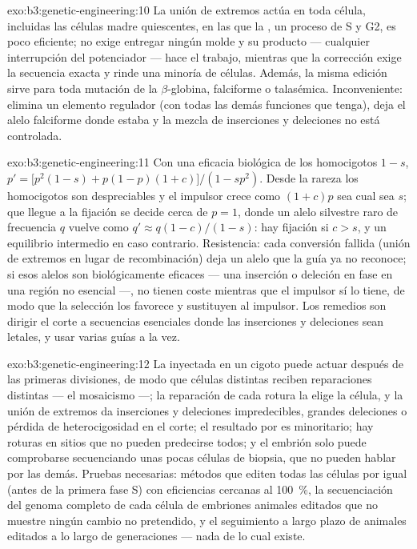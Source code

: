 \begin{solution}{exo:b3:genetic-engineering:10}
La unión de extremos actúa en toda célula, incluidas las células madre
quiescentes, en las que la , un proceso de S y G2,
es poco eficiente; no exige entregar ningún molde y su producto ---
cualquier interrupción del potenciador --- hace el trabajo, mientras que
la corrección exige la secuencia exacta y rinde una minoría de células.
Además, la misma edición sirve para toda mutación de la
$\beta$-globina, falciforme o talasémica. Inconveniente: elimina un
elemento regulador (con todas las demás funciones que tenga), deja el
alelo falciforme donde estaba y la mezcla de inserciones y deleciones no
está controlada.
\end{solution}

\begin{solution}{exo:b3:genetic-engineering:11}
Con una eficacia biológica de los homocigotos $1 - s$,
$p' = \bigl[p^{2}(1-s) + p(1-p)(1+c)
\bigr]/(1 - sp^{2})$. Desde la rareza los homocigotos son despreciables y
el impulsor crece como $(1+c)p$ sea cual sea $s$; que llegue a la
fijación se decide cerca de $p = 1$, donde un alelo silvestre raro de
frecuencia $q$ vuelve como $q' \approx q(1-c)/(1-s)$: hay fijación si
$c > s$, y un equilibrio intermedio en caso contrario. Resistencia: cada
conversión fallida (unión de extremos en lugar de recombinación) deja un
alelo que la guía ya no reconoce; si esos alelos son biológicamente
eficaces --- una inserción o deleción en fase en una región no esencial
---, no tienen coste mientras que el impulsor sí lo tiene, de modo que la
selección los favorece y sustituyen al impulsor. Los remedios son dirigir
el corte a secuencias esenciales donde las inserciones y deleciones sean
letales, y usar varias guías a la vez.
\end{solution}

\begin{solution}{exo:b3:genetic-engineering:12}
La  inyectada en un cigoto puede actuar después de las primeras
divisiones, de modo que células distintas reciben reparaciones distintas
--- el mosaicismo ---; la reparación de cada rotura la elige la célula, y
la unión de extremos da inserciones y deleciones impredecibles, grandes
deleciones o pérdida de heterocigosidad en el corte; el resultado por
 es minoritario; hay roturas  en
sitios que no pueden predecirse todos; y el embrión solo puede
comprobarse secuenciando unas pocas células de biopsia, que no pueden
hablar por las demás. Pruebas necesarias: métodos que editen todas las
células por igual (antes de la primera fase S) con eficiencias cercanas
al \qty{100}{\%}, la secuenciación del genoma completo de cada célula de
embriones animales editados que no muestre ningún cambio no pretendido, y
el seguimiento a largo plazo de animales editados a lo largo de
generaciones --- nada de lo cual existe.
\end{solution}

